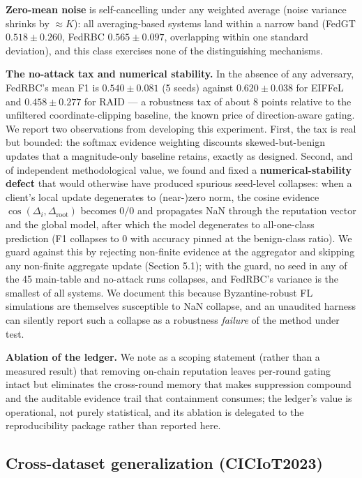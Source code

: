 \documentclass[cmc,article,submit,moreauthors,pdftex]{Definitions/tsp}
\begin{document}
\textbf{Zero-mean noise} is self-cancelling under any weighted average (noise variance shrinks by $\approx K$): all averaging-based systems land within a narrow band (FedGT $0.518 \pm 0.260$, FedRBC $0.565 \pm 0.097$, overlapping within one standard deviation), and this class exercises none of the distinguishing mechanisms.

\textbf{The no-attack tax and numerical stability.} In the absence of any adversary, FedRBC's mean F1 is $0.540 \pm 0.081$ (5 seeds) against $0.620 \pm 0.038$ for EIFFeL and $0.458 \pm 0.277$ for RAID --- a robustness tax of about 8 points relative to the unfiltered coordinate-clipping baseline, the known price of direction-aware gating. We report two observations from developing this experiment. First, the tax is real but bounded: the softmax evidence weighting discounts skewed-but-benign updates that a magnitude-only baseline retains, exactly as designed. Second, and of independent methodological value, we found and fixed a \textbf{numerical-stability defect} that would otherwise have produced spurious seed-level collapses: when a client's local update degenerates to (near-)zero norm, the cosine evidence $\cos(\Delta_i, \Delta_{\mathrm{root}})$ becomes $0/0$ and propagates NaN through the reputation vector and the global model, after which the model degenerates to all-one-class prediction (F1 collapses to 0 with accuracy pinned at the benign-class ratio). We guard against this by rejecting non-finite evidence at the aggregator and skipping any non-finite aggregate update (Section 5.1); with the guard, no seed in any of the 45 main-table and no-attack runs collapses, and FedRBC's variance is the smallest of all systems. We document this because Byzantine-robust FL simulations are themselves susceptible to NaN collapse, and an unaudited harness can silently report such a collapse as a robustness \emph{failure} of the method under test.

\textbf{Ablation of the ledger.} We note as a scoping statement (rather than a measured result) that removing on-chain reputation leaves per-round gating intact but eliminates the cross-round memory that makes suppression compound and the auditable evidence trail that containment consumes; the ledger's value is operational, not purely statistical, and its ablation is delegated to the reproducibility package rather than reported here.

\subsection{Cross-dataset generalization (CICIoT2023)}\label{sec:cross-dataset-generalization-ciciot2023}
\end{document}
